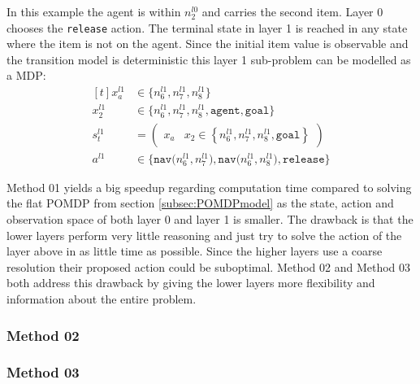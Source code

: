 \begin{example}
In this example the agent is within $n_2^{l0}$ and carries the second item. Layer 0 chooses the \texttt{release} action. The terminal state in layer 1 is reached in any state where the item is not on the agent. Since the initial item value is observable and the transition model is deterministic this layer 1 sub-problem can be modelled as a MDP:
\begin{equation}
    \begin{aligned}[t] 
        x_a^{l1} &\in \big\{ n_6^{l1}, n_7^{l1}, n_8^{l1} \big\} \\
        x_2^{l1} &\in  \big\{ n_6^{l1}, n_7^{l1}, n_8^{l1}, \texttt{agent}, \texttt{goal} \big\}\\
        s_t^{l1} &= \begin{pmatrix} x_a & x_2\in\left\{ n_6^{l1}, n_7^{l1}, n_8^{l1}, \texttt{goal} \right\} \end{pmatrix}\\
        a^{l1} &\in \big\{\texttt{nav($n_6^{l1}, n_7^{l1}$)}, \texttt{nav($n_6^{l1}, n_8^{l1}$)}, \texttt{release} \big\}
        \end{aligned}
\end{equation}
\demo
\end{example}

Method 01 yields a big speedup regarding computation time compared to solving the flat POMDP from section \ref{subsec:POMDPmodel} as the state, action and observation space of both layer 0 and layer 1 is smaller. The drawback is that the lower layers perform very little reasoning and just try to solve the action of the layer above in as little time as possible. Since the higher layers use a coarse resolution their proposed action could be suboptimal. Method 02 and Method 03 both address this drawback by giving the lower layers more flexibility and information about the entire problem.
\subsubsection{Method 02}\label{subsec:M2}

\subsubsection{Method 03}\label{subsec:M3}

